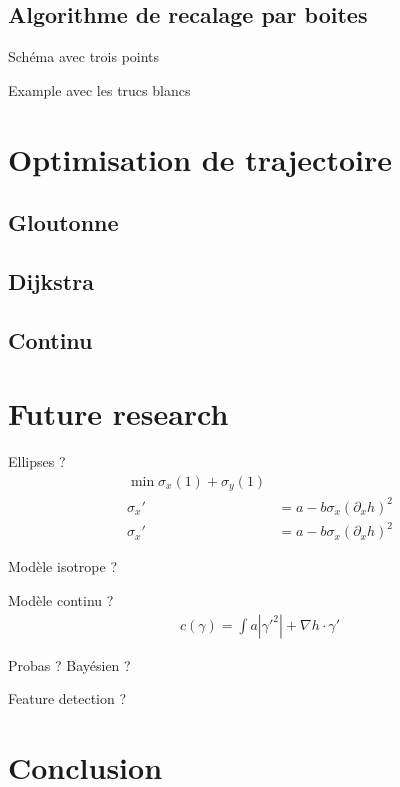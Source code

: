 \documentclass[11pt]{beamer}
\begin{document}
\subsection{Algorithme de recalage par boites}
Schéma avec trois points

Example avec les trucs blancs
\section{Optimisation de trajectoire}
\subsection{Gloutonne}
\subsection{Dijkstra}
\subsection{Continu}
\section{Future research}
Ellipses ?
\begin{align*}
  \min \sigma_{x}(1) + \sigma_{y}(1)\\
  \sigma_{x}' &= a - b \sigma_{x} (\partial_{x} h)^{2}\\
  \sigma_{x}' &= a - b \sigma_{x} (\partial_{x} h)^{2}
\end{align*}


Modèle isotrope ?

Modèle continu ?
\begin{align*}
  c(\gamma) = \int a |\gamma'^{2}| + \nabla h \cdot \gamma'
\end{align*}


Probas ? Bayésien ?

Feature detection ?
\section{Conclusion}
\end{document}
